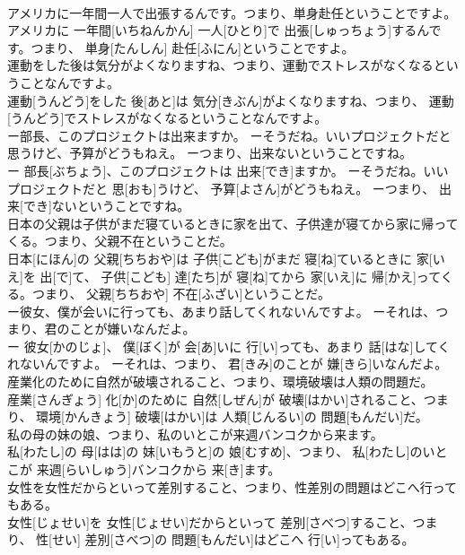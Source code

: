 \documentclass[8pt]{extreport}
\begin{document}
\begin{CJK}{UTF8}{min}
\\	アメリカに一年間一人で出張するんです。つまり、単身赴任ということですよ。	
\\	アメリカに 一年間[いちねんかん] 一人[ひとり]で 出張[しゅっちょう]するんです。つまり、 単身[たんしん] 赴任[ふにん]ということですよ。
\\	運動をした後は気分がよくなりますね、つまり、運動でストレスがなくなるということなんですよ。	
\\	運動[うんどう]をした 後[あと]は 気分[きぶん]がよくなりますね、つまり、 運動[うんどう]でストレスがなくなるということなんですよ。
\\	ー部長、このプロジェクトは出来ますか。 ーそうだね。いいプロジェクトだと思うけど、予算がどうもねえ。 ーつまり、出来ないということですね。	
\\	ー 部長[ぶちょう]、このプロジェクトは 出来[でき]ますか。 ーそうだね。いいプロジェクトだと 思[おも]うけど、 予算[よさん]がどうもねえ。 ーつまり、 出来[でき]ないということですね。
\\	日本の父親は子供がまだ寝ているときに家を出て、子供達が寝てから家に帰ってくる。つまり、父親不在ということだ。	
\\	日本[にほん]の 父親[ちちおや]は 子供[こども]がまだ 寝[ね]ているときに 家[いえ]を 出[で]て、 子供[こども] 達[たち]が 寝[ね]てから 家[いえ]に 帰[かえ]ってくる。つまり、 父親[ちちおや] 不在[ふざい]ということだ。
\\	ー彼女、僕が会いに行っても、あまり話してくれないんですよ。 ーそれは、つまり、君のことが嫌いなんだよ。	
\\	ー 彼女[かのじょ]、 僕[ぼく]が 会[あ]いに 行[い]っても、あまり 話[はな]してくれないんですよ。 ーそれは、つまり、 君[きみ]のことが 嫌[きら]いなんだよ。
\\	産業化のために自然が破壊されること、つまり、環境破壊は人類の問題だ。	
\\	産業[さんぎょう] 化[か]のために 自然[しぜん]が 破壊[はかい]されること、つまり、 環境[かんきょう] 破壊[はかい]は 人類[じんるい]の 問題[もんだい]だ。
\\	私の母の妹の娘、つまり、私のいとこが来週バンコクから来ます。	
\\	私[わたし]の 母[はは]の 妹[いもうと]の 娘[むすめ]、つまり、 私[わたし]のいとこが 来週[らいしゅう]バンコクから 来[き]ます。
\\	女性を女性だからといって差別すること、つまり、性差別の問題はどこへ行ってもある。	
\\	女性[じょせい]を 女性[じょせい]だからといって 差別[さべつ]すること、つまり、 性[せい] 差別[さべつ]の 問題[もんだい]はどこへ 行[い]ってもある。

\end{CJK}
\end{document}
